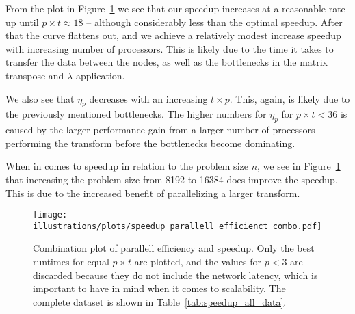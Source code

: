 From the plot in Figure~\ref{fig:plot_pe_sp} we see that our speedup increases at a reasonable rate up until $p\times t \approx 18$ -- although considerably less than the optimal speedup. After that the curve flattens out, and we achieve a relatively modest increase speedup with increasing number of processors. This is likely due to the time it takes to transfer the data between the nodes, as well as the bottlenecks in the matrix transpose and $\lambda$ application.

We also see that $\eta_p$ decreases with an increasing $t\times p$. This, again, is likely due to the previously mentioned bottlenecks. The higher numbers for $\eta_p$ for $p\times t < 36$ is caused by the larger performance gain from a larger number of processors performing the transform before the bottlenecks become dominating.

When in comes to speedup in relation to the problem size $n$, we see in Figure~\ref{fig:plot_pe_sp} that increasing the problem size from 8192 to 16384 does improve the speedup. This is due to the increased benefit of parallelizing a larger transform.


\begin{figure}[htbp]
  \centering
  \texttt{[image: illustrations/plots/speedup\_parallell\_efficienct\_combo.pdf]}
  \caption{Combination plot of parallell efficiency and speedup. Only the best runtimes for equal $p\times t$ are plotted, and the values for $p<3$ are discarded because they do not include the network latency, which is important to have in mind when it comes to scalability. The complete dataset is shown in Table~\ref{tab:speedup_all_data}.}
  \label{fig:plot_pe_sp}
\end{figure}

